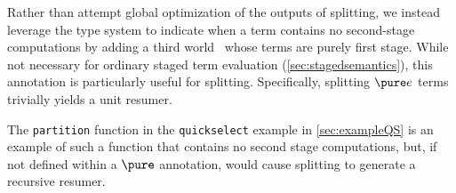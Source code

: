 \begin{abstrsyn}
Rather than attempt global optimization of the outputs of splitting,
we instead leverage the type system to indicate when a term contains
no second-stage computations by adding a third world \bbonep\ whose
terms are purely first stage.  While not necessary for ordinary staged
term evaluation (\ref{sec:stagedsemantics}), this annotation is
particularly useful for splitting. Specifically, splitting $\pure e$
terms trivially yields a unit resumer.

The \texttt{partition} function in the \texttt{quickselect} example in
\ref{sec:exampleQS} is an example of such a function that contains no
second stage computations, but, if not defined within a $\pure$
annotation, would cause splitting to generate a recursive resumer.

\end{abstrsyn}




